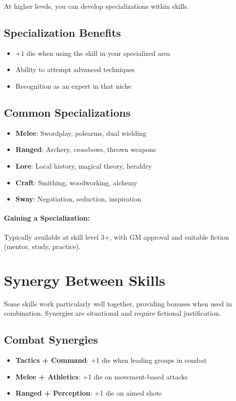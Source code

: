 At higher levels, you can develop specializations within skills.

\subsection*{Specialization Benefits}
\begin{itemize}
\item +1 die when using the skill in your specialized area
\item Ability to attempt advanced techniques
\item Recognition as an expert in that niche
\end{itemize}

\subsection*{Common Specializations}
\begin{itemize}
\item \textbf{Melee}: Swordplay, polearms, dual wielding
\item \textbf{Ranged}: Archery, crossbows, thrown weapons
\item \textbf{Lore}: Local history, magical theory, heraldry
\item \textbf{Craft}: Smithing, woodworking, alchemy
\item \textbf{Sway}: Negotiation, seduction, inspiration
\end{itemize}

\paragraph{Gaining a Specialization:}
Typically available at skill level 3+, with GM approval and suitable fiction (mentor, study, practice).

\section{Synergy Between Skills}

Some skills work particularly well together, providing bonuses when used in combination. Synergies are situational and require fictional justification.

\subsection*{Combat Synergies}
\begin{itemize}
\item \textbf{Tactics + Command}: +1 die when leading groups in combat
\item \textbf{Melee + Athletics}: +1 die on movement-based attacks
\item \textbf{Ranged + Perception}: +1 die on aimed shots
\end{itemize}

